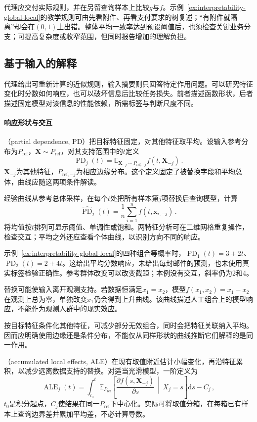 代理应交付实际规则，并在另留查询样本上比较$g$与$f$。示例~\ref{ex:interpretability-global-local}的教学规则可由先看附件、再看支付要求的树复述；“有附件就隔离”却会在$(0,1)$上出错。整体平均一致率达到预设阈值后，也须检查关键业务分支；可提高复杂度或收窄范围，但同时报告增加的理解负担。

\subsection{基于输入的解释}
\label{sec:interpretability-global-dependence}

代理给出可重新计算的近似规则，输入摘要则只回答特定作用问题。可以研究特征变化时分数如何响应，也可以破坏信息后比较任务损失。前者描述函数形状，后者描述固定模型对该信息的性能依赖，所需标签与判断尺度不同。

\paragraph{响应形状与交互}

（partial dependence, PD）把目标特征固定，对其他特征取平均。设输入参考分布为$P_{\mathrm{ref}}$，$\bm X\sim P_{\mathrm{ref}}$，对其支持范围中的$t$定义
\[
 \operatorname{PD}_j(t)
 =\mathbb E_{\bm X_{-j}\sim P_{\mathrm{ref},-j}}
 f(t,\bm X_{-j})\, .
\]
$\bm X_{-j}$为其他特征，$P_{\mathrm{ref},-j}$为相应边缘分布。这个定义固定了被替换字段和平均总体，曲线应随这两项条件解读。

经验曲线从参考总体采样，在每个$t$处把所有样本第$j$项替换后查询模型，计算
\[
 \widehat{\operatorname{PD}}_j(t)
 =\frac1n\sum_{i=1}^n f(t,\bm{x}_{i,-j})\, .
\]
将均值按$t$排列可显示阈值、单调性或饱和。两特征分析可在二维网格重复操作，检查交互；平均之外还应查看个体曲线，以识别方向不同的响应。

示例~\ref{ex:interpretability-global-local}的四种组合等概率时，$\operatorname{PD}_1(t)=3+2t$、$\operatorname{PD}_2(t)=2+4t$。这给出平均分数响应，未给出每封邮件的预测，也未使用真实标签检验正确性。参考群体改变可以改变截距；本例没有交互，斜率仍为2和4。

替换可能使输入离开观测支持。若数据恒满足$x_1=x_2$，模型$f(x_1,x_2)=x_1-x_2$在观测上总为零，单独改变$x_1$仍会得到上升曲线。该曲线描述人工组合上的模型响应，不能作为观测人群中的现实效应。

按目标特征条件化其他特征，可减少部分无效组合，同时会把特征关联纳入平均。因而应明确使用边缘还是条件分布，不能仅从同样形状的曲线推断它们解释的是同一作用。

（accumulated local effects, ALE）在现有取值附近估计小幅变化，再沿特征累积，以减少远离数据支持的替换。对适当光滑模型，一阶定义为
\begin{equation}
 \operatorname{ALE}_j(t)
 =\int_{t_0}^{t}
 \mathbb E_{P_{\mathrm{ref}}}\!\left[
 \frac{\partial f(s,\bm X_{-j})}{\partial s}
 \,\middle|\,X_j=s\right]\mathrm ds-C_j\, ,
 \label{eq:interpretability-ale}
\end{equation}
$t_0$是积分起点，$C_j$使结果在同一$P_{\mathrm{ref}}$下中心化。实际可将取值分箱，在每箱已有样本上查询边界差并累加平均差，不必计算导数。

